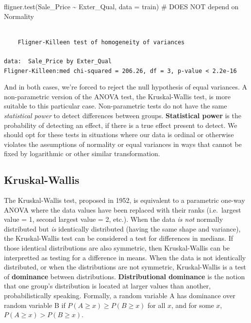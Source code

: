\documentclass[
  letterpaper,
  DIV=11,
  numbers=noendperiod]{scrreprt}
\newenvironment{Shaded}{\begin{snugshade}}{\end{snugshade}}
\newcommand{\AttributeTok}[1]{\textcolor[rgb]{0.40,0.45,0.13}{#1}}
\newcommand{\CommentTok}[1]{\textcolor[rgb]{0.37,0.37,0.37}{#1}}
\newcommand{\FunctionTok}[1]{\textcolor[rgb]{0.28,0.35,0.67}{#1}}
\newcommand{\NormalTok}[1]{\textcolor[rgb]{0.00,0.23,0.31}{#1}}
\newcommand{\SpecialCharTok}[1]{\textcolor[rgb]{0.37,0.37,0.37}{#1}}
\begin{document}
\begin{Shaded}
\begin{Highlighting}[]
\FunctionTok{fligner.test}\NormalTok{(Sale\_Price }\SpecialCharTok{\textasciitilde{}}\NormalTok{ Exter\_Qual, }\AttributeTok{data =}\NormalTok{ train) }\CommentTok{\# DOES NOT depend on Normality}
\end{Highlighting}
\end{Shaded}

\begin{verbatim}

    Fligner-Killeen test of homogeneity of variances

data:  Sale_Price by Exter_Qual
Fligner-Killeen:med chi-squared = 206.26, df = 3, p-value < 2.2e-16
\end{verbatim}

And in both cases, we're forced to reject the null hypothesis of equal
variances. A non-parametric version of the ANOVA test, the
Kruskal-Wallis test, is more suitable to this particular case.
Non-parametric tests do not have the same \emph{statistical power} to
detect differences between groups. \textbf{Statistical power} is the
probability of detecting an effect, if there is a true effect present to
detect. We should opt for these tests in situations where our data is
ordinal or otherwise violates the assumptions of normality or equal
variances in ways that cannot be fixed by logarithmic or other similar
transformation.

\hypertarget{kruskal}{%
\subsection{Kruskal-Wallis}\label{kruskal}}

The Kruskal-Wallis test, proposed in 1952, is equivalent to a parametric
one-way ANOVA where the data values have been replaced with their ranks
(i.e.~largest value = 1, second largest value = 2, etc.). When the data
\emph{is not} normally distributed but \emph{is} identically distributed
(having the same shape and variance), the Kruskal-Wallis test can be
considered a test for differences in medians. If those identical
distributions are also symmetric, then Kruskal-Wallis can be
interpretted as testing for a difference in means. When the data is not
identically distributed, or when the distributions are not symmetric,
Kruskal-Wallis is a test of \textbf{dominance} between distributions.
\textbf{Distributional dominance} is the notion that one group's
distribution is located at larger values than another, probabilistically
speaking. Formally, a random variable A has dominance over random
variable B if \(P(A\geq x) \geq P(B\geq x)\) for all \(x\), and for some
\(x\), \(P(A\geq x) > P(B\geq x)\).
\end{document}
